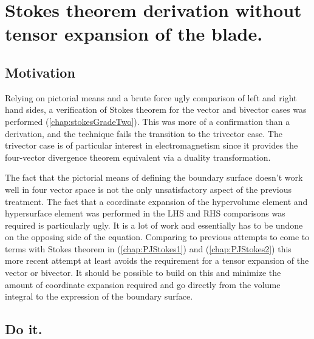 %

\chapter{Stokes theorem derivation without tensor expansion of the blade.}
\label{chap:stokesNoTensor}


\date{July 21, 2009.  $RCSfile: stokesNoTensor.tex,v $ Last $Revision: 1.9 $ $Date: 2009/08/01 22:12:18 $}

\beginArtWithToc

\section{Motivation}

Relying on pictorial means and a brute force ugly comparison of left and right hand sides, a verification of Stokes theorem for the vector and bivector cases was performed (\ref{chap:stokesGradeTwo}).  This was more of a confirmation than a derivation, and the technique fails the transition to the trivector case.  The trivector case is of particular interest in electromagnetism since it provides the four-vector divergence theorem equivalent via a duality transformation.

The fact that the pictorial means of defining the boundary surface doesn't work well in four vector space is not the only unsatisfactory aspect of the previous treatment.  The fact that a coordinate expansion of the hypervolume element and hypersurface element was performed in the LHS and RHS comparisons was required is particularly ugly.  It is a lot of work and essentially has to be undone on the opposing side of the equation.  Comparing to previous attempts to come to terms with Stokes theorem in (\ref{chap:PJStokes1}) and (\ref{chap:PJStokes2}) this more recent attempt at least avoids the requirement for a tensor expansion of the vector or bivector.  It should be possible to build on this and minimize the amount of coordinate expansion required and go directly from the volume integral to the expression of the boundary surface.

\section{Do it.}
